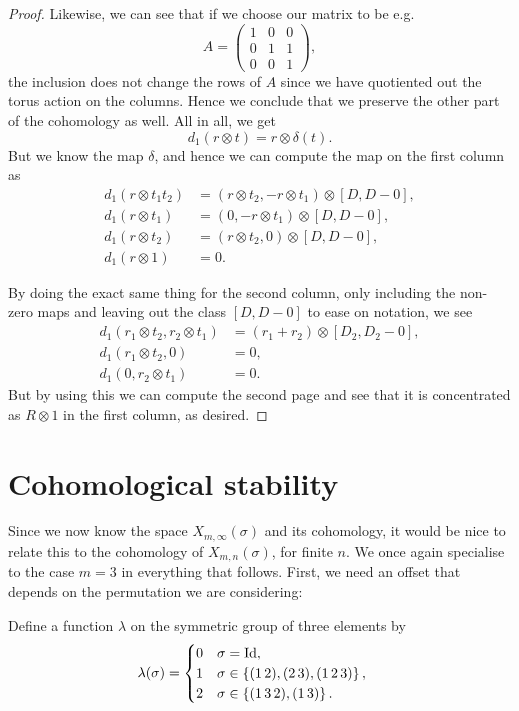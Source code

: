 \begin{proof}
  Likewise, we can see that if we choose our matrix to be e.g.
  \[ A = \begin{pmatrix}
    1 & 0 & 0 \\
    0 & 1 & 1 \\
    0 & 0 & 1
  \end{pmatrix}, \]
  the inclusion does not change the rows of $A$ since we have
  quotiented out the torus action on the columns. Hence we conclude
  that we preserve the other part of the cohomology as well. All in
  all, we get
  \[ d_1(r\otimes t) = r \otimes \delta(t). \]
  But we know the map $\delta$, and hence we can compute the map on
  the first
  column as
  \begin{align*}
    d_1(r \otimes t_1t_2) &= ( r\otimes t_2, - r\otimes t_1) \otimes
    [D,D-0], \\
    d_1(r \otimes t_1) &= (0, -r\otimes t_1) \otimes [D,D-0], \\
    d_1(r \otimes t_2) &= (r\otimes t_2,0) \otimes [D,D-0], \\
    d_1(r \otimes 1) &= 0.
  \end{align*}

  By doing the exact same thing for the second column, only including
  the non-zero maps and leaving out
  the class $[D,D-0]$ to ease on notation, we see
  \begin{align*}
    d_1( r_1\otimes t_2, r_2\otimes t_1) &= (r_1 + r_2) \otimes
                                           [D_2,D_2-0], \\
    d_1( r_1 \otimes t_2, 0) &= 0, \\
    d_1( 0, r_2\otimes t_1) &= 0.
  \end{align*} 
  But by using this we can compute the second page and see that it is
  concentrated as $R\otimes 1$ in the first column, as desired.
\end{proof}


\section{Cohomological stability}
\label{sec:costa}
Since we now know the space $X_{m,\infty}(\sigma)$ and its cohomology, it
would be nice to relate this to the cohomology of
$X_{m,n}(\sigma)$, for finite $n$. We once again specialise to the
case $m = 3$ in
everything that
follows. First, we need an offset that depends on the permutation
we are considering:
\begin{definition}
  Define a function $\lambda$ on the symmetric group of three elements
  by
  \begin{align*}
    \lambda(\sigma) &=
                      \begin{cases}
                        0 & \sigma = \operatorname{Id}, \\
                        1 & \sigma \in \left\{ (1\,2),(2\,3),(1\,2\,3) \right\},
                        \\
                        2 & \sigma \in \left\{ (1\,3\,2), (1\,3) \right\}.
                      \end{cases}
  \end{align*}
\end{definition}

